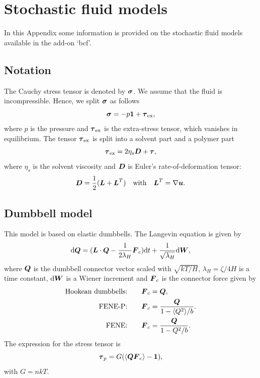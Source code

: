 
\chapter{Stochastic fluid models}
\label{chap:stochasticmodels}

\def\chaptertitle{Stochastic fluid models}
\def\headdate{6th February 2009}

In this Appendix some information is provided on the stochastic fluid
models available in the add-on `bcf'.

\section{Notation}

The Cauchy stress tensor is denoted by $\boldsymbol{\sigma}$. We assume that
the fluid is incompressible.  Hence, we split $\boldsymbol{\sigma}$
as follows
\[
   \boldsymbol{\sigma} = -p\boldsymbol{1} +\boldsymbol{\tau}_\text{ex},
\]
where $p$ is the pressure and $\boldsymbol{\tau}_\text{ex}$ is the extra-stress tensor,
which vanishes in equilibrium.
The tensor $\boldsymbol{\tau}_\text{ex}$ is split into a solvent part and a polymer part
\[
   \boldsymbol{\tau}_\text{ex} = 2\eta_s\boldsymbol{D} + \boldsymbol{\tau}, 
\]
where $\eta_s$ is the solvent viscosity and $\boldsymbol{D}$ is Euler's
rate-of-deformation tensor: 
\[
         \boldsymbol{D}=\frac12(\boldsymbol{L} + \boldsymbol{L}^T)\quad\text{with}\quad 
         \boldsymbol{L}^T= \nabla\boldsymbol{u}.
\]

\section{Dumbbell model}

This model is based on elastic dumbbells. The Langevin equation is
given by
\begin{equation}
  \mathrm{d}\boldsymbol{Q}=(\boldsymbol{L}\cdot\boldsymbol{Q} - \frac{1}{2\lambda_H}\boldsymbol{F}_c)
    \mathrm{d}t+\frac{1}{\sqrt{\lambda_H}}\mathrm{d}\boldsymbol{W},
\label{eq:Langevin}
\end{equation}
where $\boldsymbol{Q}$ is the dumbbell connector vector scaled with
$\sqrt{kT/H}$, $\lambda_H=\zeta/4H$ is a time constant, $\mathrm{d}\boldsymbol{W}$
is a Wiener increment and $\boldsymbol{F}_c$ is the connector force given by
\begin{align*}
     \text{Hookean dumbbells:\qquad}\boldsymbol{F}_c&=\boldsymbol{Q},\\
     \text{FENE-P:\qquad}\boldsymbol{F}_c&=\frac{\boldsymbol{Q}}{1-\langle Q^2\rangle/b}.\\
     \text{FENE:\qquad}\boldsymbol{F}_c&=\frac{\boldsymbol{Q}}{1-Q^2/b}.
\end{align*}
The expression for the stress tensor is
\begin{equation}
 \boldsymbol{\tau}_p=G(\langle\boldsymbol{Q}\boldsymbol{F}_c\rangle-\boldsymbol{1} ),
 \label{eq:sttress}
\end{equation}
with $G=nkT$.

